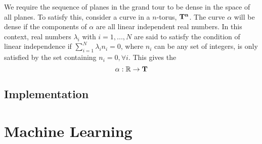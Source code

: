 \documentclass[a4paper,11pt,twoside]{article}
\begin{document}
We require the sequence of planes in the grand tour to be dense in the space of all planes. To satisfy this, consider a curve in a $n$-torus, $\bf{T}^n$. The curve $\alpha$ will be dense if the components of $\alpha$ are all linear independent real numbers. In this context, real numbers $\lambda_i$ with  $i=1,...,N$ are said to satisfy the condition of linear independence if $\sum_{i=1}^N \lambda_i n_i=0$, where $n_i$ can be any set of integers, is only satisfied by the set containing $n_i=0, \forall i$. This gives the 
\begin{equation}
\alpha: \Bbb R \rightarrow \bf{T}

\end{equation}

\subsection{Implementation}

\newpage
\section{Machine Learning}
\end{document}
